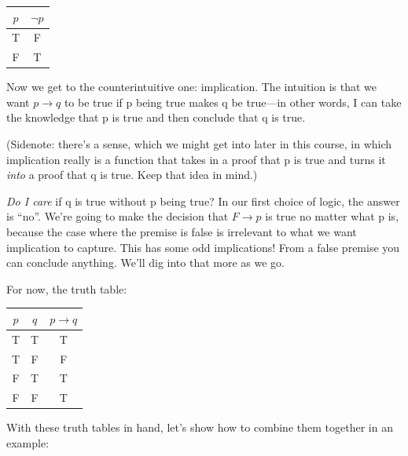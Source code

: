 \documentclass[11pt]{article}
\begin{document}
\begin{center}
\begin{tabular}{c|c}
\toprule
$p$ & $\lnot p$ \\
\midrule
T & F \\
F & T \\
\bottomrule
\end{tabular}
\end{center}

Now we get to the counterintuitive one: implication. The intuition is that we want $p \to q$ to be true if p being true makes q be true---in other words, I can take the knowledge that p is true and then conclude that q is true.

(Sidenote: there's a sense, which we might get into later in this course, in which implication really is a function that takes in a proof that p is true and turns it \emph{into} a proof that q is true. Keep that idea in mind.)

\emph{Do I care} if q is true without p being true? In our first choice of logic, the answer is ``no''. We're going to make the decision that $F \to p$ is true no matter what p is, because the case where the premise is false is irrelevant to what we want implication to capture. This has some odd implications! From a false premise you can conclude anything. We'll dig into that more as we go.

For now, the truth table:

\begin{center}
\begin{tabular}{cc|c}
\toprule
$p$ & $q$ & $p \to q$ \\
\midrule
T & T & T \\
T & F & F \\
F & T & T \\
F & F & T \\
\bottomrule
\end{tabular}
\end{center}

With these truth tables in hand, let's show how to combine them together in an example:
\end{document}
